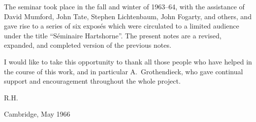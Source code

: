\documentclass[12pt]{book}
\begin{document}
The seminar took place in the fall and winter of 1963--64, with the assistance of David Mumford, John Tate, Stephen Lichtenbaum, John Fogarty, and others, and gave rise to a series of six exposés which were circulated to a limited audience under the title ``Séminaire Hartshorne''. The present notes are a revised, expanded, and completed version of the previous notes.

I would like to take this opportunity to thank all those people who have helped in the course of this work, and in particular A.~Grothendieck, who gave continual support and encouragement throughout the whole project.

\vspace{1cm}
\hfill R.H.\par
\hfill Cambridge, May 1966

\clearpage
\tableofcontents

\mainmatter









\end{document}
